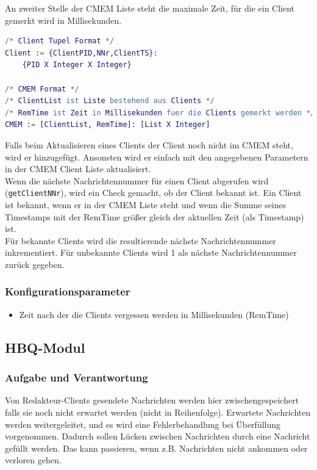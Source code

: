 \documentclass{article}
\begin{document}
An zweiter Stelle der CMEM Liste steht die maximale Zeit, für die ein Client gemerkt wird in Millisekunden.

\begin{lstlisting}[language=erlang]
/* Client Tupel Format */
Client := {ClientPID,NNr,ClientTS}:
    {PID X Integer X Integer}

/* CMEM Format */
/* ClientList ist Liste bestehend aus Clients */
/* RemTime ist Zeit in Millisekunden fuer die Clients gemerkt werden */
CMEM := [ClientList, RemTime]: [List X Integer]
\end{lstlisting}

Falls beim Aktualisieren eines Clients der Client noch nicht im CMEM steht, wird er hinzugefügt.
Ansonsten wird er einfach mit den angegebenen Parametern in der CMEM Client Liste aktualisiert.\\

Wenn die nächste Nachrichtennummer für einen Client abgerufen wird (\texttt{getClientNNr}), wird ein Check gemacht, ob der Client bekannt ist.
Ein Client ist bekannt, wenn er in der CMEM Liste steht und wenn die Summe seines Timestamps mit der RemTime größer gleich der aktuellen Zeit (als Timestamp) ist.\\

Für bekannte Clients wird die resultierende nächste Nachrichtennummer inkrementiert. Für unbekannte Clients wird 1 als nächste Nachrichtennummer zurück gegeben.

\subsubsection{Konfigurationsparameter}
\begin{itemize}
    \item Zeit nach der die Clients vergessen werden in Millisekunden (RemTime)
\end{itemize}

\newpage
			
\subsection{HBQ-Modul}
\subsubsection{Aufgabe und Verantwortung}

Von Redakteur-Clients gesendete Nachrichten werden hier zwischengespeichert falls sie noch nicht
erwartet werden (nicht in Reihenfolge). Erwartete Nachrichten werden weitergeleitet, und es wird eine Fehlerbehandlung
bei Überfüllung vorgenommen. Dadurch sollen Lücken zwischen Nachrichten durch eine Nachricht gefüllt werden. Das kann
passieren, wenn z.B. Nachrichten nicht ankommen oder verloren gehen.
\end{document}
